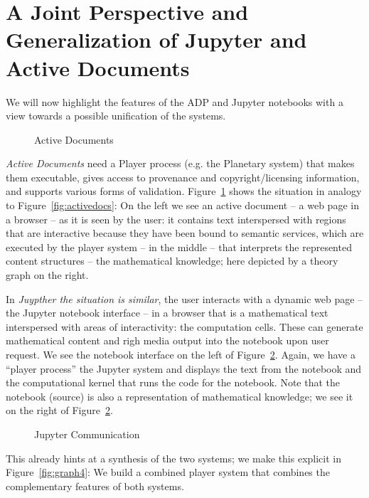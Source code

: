\section{A Joint Perspective and Generalization of Jupyter and Active
  Documents}\label{sec:comparison}

We will now highlight the features of the ADP and Jupyter notebooks with a view towards a
possible unification of the systems.

\begin{figure}[ht]
  
  \caption{Active Documents}\label{fig:graph2}
\end{figure}

\emph{Active Documents} need a Player process (e.g. the Planetary system) that makes them
executable, gives access to provenance and copyright/licensing information, and supports
various forms of validation. Figure~\ref{fig:graph2} shows the situation in analogy to
Figure~\ref{fig:activedocs}: On the left we see an active document -- a web page in a
browser -- as it is seen by the user: it contains text interspersed with regions that are
interactive because they have been bound to semantic services, which are executed by the
player system -- in the middle -- that interprets the represented content structures --
the mathematical knowledge; here depicted by a theory graph on the right.


In \emph{Juypther the situation is similar}, the user interacts with a dynamic web page --
the Jupyter notebook interface -- in a browser that is a mathematical text interspersed
with areas of interactivity: the computation cells. These can generate mathematical
content and righ media output into the notebook upon user request. We see the notebook
interface on the left of Figure~\ref{fig:graph3}. Again, we have a ``player process'' the
Jupyter system and displays the text from the notebook and the computational kernel that
runs the code for the notebook. Note that the notebook (source) is also a representation
of mathematical knowledge; we see it on the right of Figure~\ref{fig:graph3}.

\begin{figure}[ht]
  
  \caption{Jupyter Communication}\label{fig:graph3}
\end{figure}

This already hints at a synthesis of the two systems; we make this explicit in
Figure~\ref{fig:graph4}: We build a combined player system that combines the complementary
features of both systems. 

